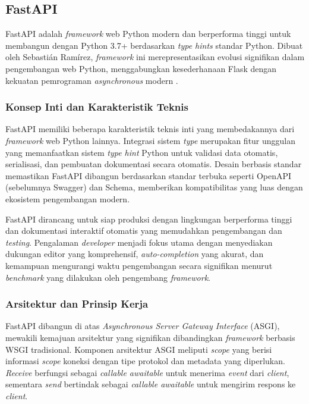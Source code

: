 \subsection{FastAPI}
\label{subsec:fastapi}

FastAPI adalah \emph{framework} web Python modern dan berperforma tinggi untuk membangun \api dengan Python 3.7+ berdasarkan \emph{type hints} standar Python. Dibuat oleh Sebastián Ramírez, \emph{framework} ini merepresentasikan evolusi signifikan dalam pengembangan web Python, menggabungkan kesederhanaan Flask dengan kekuatan pemrograman \emph{asynchronous} modern \parencite{ramirez2020fastapi}.

\subsubsection{Konsep Inti dan Karakteristik Teknis}

FastAPI memiliki beberapa karakteristik teknis inti yang membedakannya dari \emph{framework} web Python lainnya. Integrasi sistem \emph{type} merupakan fitur unggulan yang memanfaatkan sistem \emph{type hint} Python untuk validasi data otomatis, serialisasi, dan pembuatan dokumentasi secara otomatis. Desain berbasis standar memastikan FastAPI dibangun berdasarkan standar terbuka seperti OpenAPI (sebelumnya Swagger) dan \json Schema, memberikan kompatibilitas yang luas dengan ekosistem pengembangan modern.

FastAPI dirancang untuk siap produksi dengan lingkungan berperforma tinggi dan dokumentasi interaktif otomatis yang memudahkan pengembangan dan \emph{testing}. Pengalaman \emph{developer} menjadi fokus utama dengan menyediakan dukungan editor yang komprehensif, \emph{auto-completion} yang akurat, dan kemampuan mengurangi waktu pengembangan secara signifikan menurut \emph{benchmark} yang dilakukan oleh pengembang \emph{framework}.

\subsubsection{Arsitektur dan Prinsip Kerja}

FastAPI dibangun di atas \emph{Asynchronous Server Gateway Interface} (ASGI), mewakili kemajuan arsitektur yang signifikan dibandingkan \emph{framework} berbasis WSGI tradisional. Komponen arsitektur ASGI meliputi \emph{scope} yang berisi informasi \emph{scope} koneksi dengan tipe protokol dan metadata yang diperlukan. \emph{Receive} berfungsi sebagai \emph{callable awaitable} untuk menerima \emph{event} dari \emph{client}, sementara \emph{send} bertindak sebagai \emph{callable awaitable} untuk mengirim respons ke \emph{client}.

